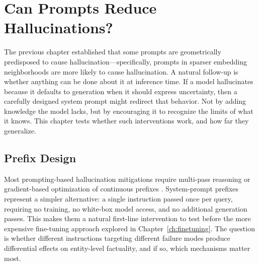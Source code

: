 \chapter{Can Prompts Reduce Hallucinations?}
\label{ch:prefixes}


The previous chapter established that some prompts are geometrically predisposed to cause hallucination\allowbreak---specifically, prompts in sparser embedding neighborhoods are more likely to cause hallucination. A natural follow-up is whether anything can be done about it at inference time. If a model hallucinates because it defaults to generation when it should express uncertainty, then a carefully designed system prompt might redirect that behavior. Not by adding knowledge the model lacks, but by encouraging it to recognize the limits of what it knows. This chapter tests whether such interventions work, and how far they generalize.

\section{Prefix Design}
\label{sec:prefix-design}

Most prompting-based hallucination mitigations require multi-pass reasoning \citep{dhuliawala2023chainofverification,wang2023selfconsistency} or gradient-based optimization of continuous prefixes \citep{jones2024teaching}. System-prompt prefixes represent a simpler alternative: a single instruction passed once per query, requiring no training, no white-box model access, and no additional generation passes.  This makes them a natural first-line intervention to test before the more expensive fine-tuning approach explored in Chapter~\ref{ch:finetuning}. The question is whether different instructions targeting different failure modes produce differential effects on entity-level factuality, and if so, which mechanisms matter most.

